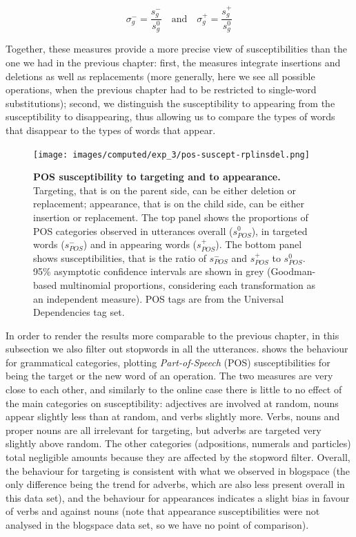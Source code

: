 \documentclass[a4paper,fleqn]{cas-dc}
\begin{document}
\[\sigma_g^- = \frac{s_g^-}{s_g^0} \quad \text{and} \quad \sigma_g^+ = \frac{s_g^+}{s_g^0}\]

Together, these measures provide a more precise view of susceptibilities
than the one we had in the previous chapter: first, the measures
integrate insertions and deletions as well as replacements (more
generally, here we see all possible operations, when the previous
chapter had to be restricted to single-word substitutions); second, we
distinguish the susceptibility to appearing from the susceptibility to
disappearing, thus allowing us to compare the types of words that
disappear to the types of words that appear.

\begin{figure}
  \centering
  \texttt{[image: images/computed/exp\_3/pos-suscept-rplinsdel.png]}
  \caption[POS susceptibility to targeting and to appearance]{
  \textbf{POS susceptibility to targeting and to appearance.}
  Targeting, that is on the parent side, can be either deletion or replacement;
  appearance, that is on the child side, can be either insertion or replacement.
  The top panel shows the proportions of POS categories observed in utterances overall ($s_{POS}^0$), in targeted words ($s_{POS}^-$) and in appearing words ($s_{POS}^+$).
  The bottom panel shows susceptibilities, that is the ratio of $s_{POS}^-$ and $s_{POS}^+$ to $s_{POS}^0$.
  95\% asymptotic confidence intervals are shown in grey (Goodman-based multinomial proportions, considering each transformation as an independent measure).
  POS tags are from the Universal Dependencies tag set.
  }
  \label{fig:gistr-suscept-pos}
\end{figure}

In order to render the results more comparable to the previous chapter,
in this subsection we also filter out stopwords in all the utterances.
 shows the behaviour for grammatical
categories, plotting \emph{Part-of-Speech} (POS) susceptibilities for
being the target or the new word of an operation. The two measures are
very close to each other, and similarly to the online case there is
little to no effect of the main categories on susceptibility: adjectives
are involved at random, nouns appear slightly less than at random, and
verbs slightly more. Verbs, nouns and proper nouns are all irrelevant
for targeting, but adverbs are targeted very slightly above random. The
other categories (adpositions, numerals and particles) total negligible
amounts because they are affected by the stopword filter. Overall, the
behaviour for targeting is consistent with what we observed in blogspace
(the only difference being the trend for adverbs, which are also less
present overall in this data set), and the behaviour for appearances
indicates a slight bias in favour of verbs and against nouns (note that
appearance susceptibilities were not analysed in the blogspace data set,
so we have no point of comparison).
\end{document}
